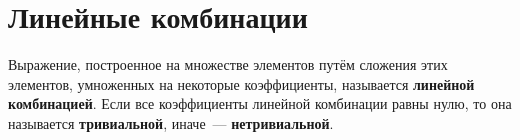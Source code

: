 \section{Линейные комбинации}
 Выражение, построенное на множестве элементов путём сложения этих элементов, умноженных на некоторые коэффициенты, называется \textbf{линейной комбинацией}.
Если все коэффициенты линейной комбинации равны нулю, то она называется \textbf{тривиальной}, иначе~--- \textbf{нетривиальной}.